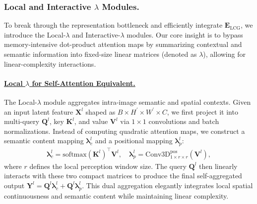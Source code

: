 \documentclass{llmxive}
\begin{document}
\vspace{-1.6em}
\subsubsection{Local and Interactive \texorpdfstring{$\lambda$}{...} Modules.}\label{sec:lambda_modules}
To break through the representation bottleneck and efficiently integrate $\mathbf{E}_\text{LCG}$, we introduce the Local-$\lambda$ and Interactive-$\lambda$ modules. Our core insight is to bypass memory-intensive dot-product attention maps by summarizing contextual and semantic information into fixed-size linear matrices (denoted as $\lambda$), allowing for linear-complexity interactions.

\vspace{-0.5em}
\paragraph{\underline{Local \texorpdfstring{$\lambda$}{...} for Self-Attention Equivalent.}}
The Local-$\lambda$ module aggregates intra-image semantic and spatial contexts. Given an input latent feature $\mathbf{X}^l$ shaped as $B\times H^\prime\times W^\prime\times C$, we first project it into multi-query $\mathbf{Q}^l$, key $\mathbf{K}^l$, and value $\mathbf{V}^l$ via $1\times1$ convolutions and batch normalizations. Instead of computing quadratic attention maps, we construct a semantic content mapping $\boldsymbol{\lambda}^l_c$ and a positional mapping $\boldsymbol{\lambda}^l_p$:
\begin{equation}
\begin{gathered}
\boldsymbol{\lambda}^l_c = \mathrm{softmax}(\mathbf{K}^l)^\top \mathbf{V}^l, \quad
\boldsymbol{\lambda}^l_p = \mathrm{Conv3D}^{\text{pos}}_{1\times r\times r}(\mathbf{V}^l), 
\end{gathered}
\end{equation}
where $r$ defines the local perception window size. The query $\mathbf{Q}^l$ then linearly interacts with these two compact matrices to produce the final self-aggregated output $\mathbf{Y}^l = \mathbf{Q}^l \boldsymbol{\lambda}^l_c + \mathbf{Q}^l \boldsymbol{\lambda}^l_p$. This dual aggregation elegantly integrates local spatial continuousness and semantic content while maintaining linear complexity.

\vspace{-0.5em}
\end{document}
